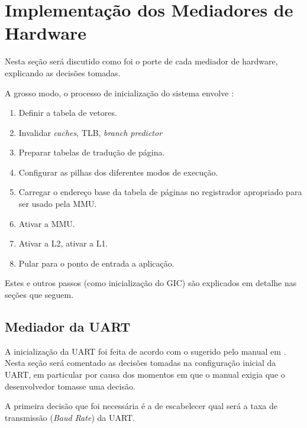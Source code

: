 \chapter{Implementação dos Mediadores de Hardware}




Nesta seção será discutido como foi o porte de cada mediador de hardware, explicando as decisões tomadas.

A grosso modo, o processo de inicialização do sistema envolve \cite[p.~110]{ug585.1.7}:

%
%
\begin{enumerate}
	\item Definir a tabela de vetores.
	\item Invalidar \emph{caches}, TLB, \emph{branch predictor}
	\item Preparar tabelas de tradução de página.
	\item Configurar as pilhas dos diferentes modos de execução.
	\item Carregar o endereço base da tabela de páginas no registrador apropriado para ser usado pela MMU.
	\item Ativar a MMU.
	\item Ativar a L2, ativar a L1.
	\item Pular para o ponto de entrada a aplicação.
\end{enumerate}

Estes e outros passos (como inicialização do GIC) são explicados em detalhe nas seções que seguem.




\section{Mediador da UART}

A inicialização da UART foi feita de acordo com o sugerido pelo manual em \cite[p.~554]{ug585}. Nesta seção será comentado as decisões tomadas na configuração inicial da UART, em particular por causa dos momentos em que o manual exigia que o desenvolvedor tomasse uma decisão.

A primeira decisão que foi necessária é a de escabelecer qual será a taxa de transmissão (\emph{Baud Rate}) da UART. 

